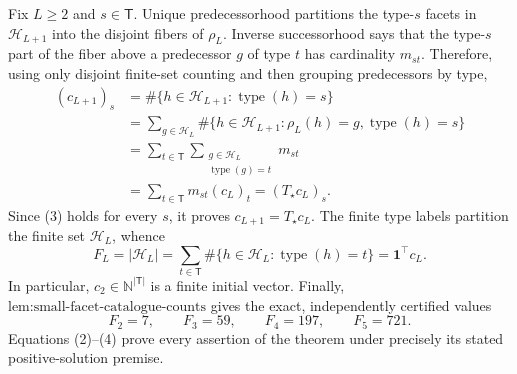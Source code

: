 Fix \(L\ge2\) and \(s\in\mathsf T\).  Unique predecessorhood partitions the type-\(s\) facets in \(\mathcal H_{L+1}\) into the disjoint fibers of \(\rho_L\).  Inverse successorhood says that the type-\(s\) part of the fiber above a predecessor \(g\) of type \(t\) has cardinality \(m_{st}\).  Therefore, using only disjoint finite-set counting and then grouping predecessors by type,
\[
\begin{aligned}
(c_{L+1})_s
&=\#\{h\in\mathcal H_{L+1}:\operatorname{type}(h)=s\}\\
&=\sum_{g\in\mathcal H_L}
   \#\{h\in\mathcal H_{L+1}:\rho_L(h)=g,
                  \operatorname{type}(h)=s\}\\
&=\sum_{t\in\mathsf T}
   \sum_{\substack{g\in\mathcal H_L\\\operatorname{type}(g)=t}}m_{st}\\
&=\sum_{t\in\mathsf T}m_{st}(c_L)_t
=(T_\star c_L)_s.
\end{aligned}\tag{3}
\]
Since (3) holds for every \(s\), it proves \(c_{L+1}=T_\star c_L\).  The finite type labels partition the finite set \(\mathcal H_L\), whence
\[
F_L=|\mathcal H_L|
=\sum_{t\in\mathsf T}\#\{h\in\mathcal H_L:\operatorname{type}(h)=t\}
=\mathbf 1^\top c_L. \tag{4}
\]
In particular, \(c_2\in\mathbb N^{|\mathsf T|}\) is a finite initial vector.  Finally, \(\text{lem:small-facet-catalogue-counts}\) gives the exact, independently certified values
\[
F_2=7,\qquad F_3=59,\qquad F_4=197,\qquad F_5=721.
\]
Equations (2)--(4) prove every assertion of the theorem under precisely its stated positive-solution premise.
